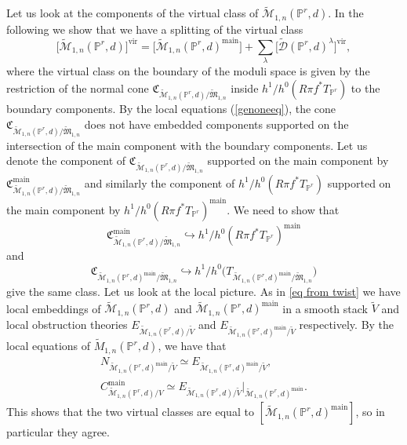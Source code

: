 \documentclass[pdftex]{sigma}
\numberwithin{equation}{section}
\newcommand{\vv}{\mathrm{vir}}
\newcommand{\PP}{\mathbb P}
\theoremstyle{plain}
\theoremstyle{definition}
\theoremstyle{remark}
\begin{document}
\begin{Example} Let us look at the components of the virtual class of $\widetilde{\mathcal{M}}_{1,n}(\PP^r,d)$. In the following we show that we have a splitting of the virtual class
\[\big[\widetilde{\mathcal{M}}_{1,n}(\PP^r,d)\big]^{\vv}=\big[\widetilde{\mathcal{M}}_{1,n} (\PP^r,d)^{\mathrm{main}}\big]+\sum_{\lambda}\big[\widetilde{\mathcal{D}}(\PP^r,d)^{\lambda}\big]^{\vv},
\]
where the virtual class on the boundary of the moduli space is given by the restriction of the normal cone $\mathfrak{C}_{\widetilde{\mathcal{M}}_{1,n}(\PP^r,d)/\widetilde{\mathfrak{M}}_{1,n}}$ inside $h^1/h^0(R\pi f^*T_{\PP^r})$ to the boundary components. By the local equations (\ref{genoneeq}), the cone $\mathfrak{C}_{\widetilde{\mathcal{M}}_{1,n}(\PP^r,d)/\widetilde{\mathfrak{M}}_{1,n}}$ does not have embedded components supported on the intersection of the main component with the boundary components. Let us denote the component of $\mathfrak{C}_{\widetilde{\mathcal{M}}_{1,n}(\PP^r,d)/\widetilde{\mathfrak{M}}_{1,n}}$ supported on the main component by $\mathfrak{C}^{\mathrm{main}}_{\widetilde{\mathcal{M}}_{1,n}(\PP^r,d)/\widetilde{\mathfrak{M}}_{1,n}}$ and similarly the component of $h^1/h^0(R\pi f^*T_{\PP^r})$ supported on the main component by $h^1/h^0(R\pi f^*T_{\PP^r})^{\mathrm{main}}$. We need to show that
\[\mathfrak{C}^{\mathrm{main}}_{\widetilde{\mathcal{M}}_{1,n}(\PP^r,d)/\widetilde{\mathfrak{M}}_{1,n}}\hookrightarrow h^1/h^0(R\pi f^*T_{\PP^r})^{\mathrm{main}}\]
 and
 \[\mathfrak{C}_{\widetilde{\mathcal{M}}_{1,n}(\PP^r,d)^{\mathrm{main}}/\widetilde{\mathfrak{M}}_{1,n}}\hookrightarrow h^1/h^0\big(T_{\widetilde{\mathcal{M}}_{1,n}(\PP^r,d)^{\mathrm{main}}/\widetilde{\mathfrak{M}}_{1,n}}\big)
 \]
 give the same class. Let us look at the local picture. As in \ref{eq from twist} we have local embeddings of $\widetilde{\mathcal{M}}_{1,n}(\PP^r,d)$ and $\widetilde{\mathcal{M}}_{1,n}(\PP^r,d)^{\mathrm{main}}$ in a smooth stack $\widetilde{V}$ and local obstruction theories $E_{\widetilde{\mathcal{M}}_{1,n}(\PP^r,d)/\widetilde{V}}$ and $E_{\widetilde{\mathcal{M}}_{1,n}(\PP^r,d)^{\mathrm{main}}/\widetilde{V}}$ respectively. By the local equations of $\widetilde{M}_{1,n}(\PP^r,d)$, we have that
\begin{gather*}
N_{\widetilde{\mathcal{M}}_{1,n}(\PP^r,d)^{\mathrm{main}}/\widetilde{V}}\simeq E_{\widetilde{\mathcal{M}}_{1,n}(\PP^r,d)^{\mathrm{main}}/\widetilde{V}},
\\
C_{\widetilde{\mathcal{M}}_{1,n}(\PP^r,d)/V}^{\mathrm{main}}\simeq E_{\widetilde{\mathcal{M}}_{1,n}(\PP^r,d)/\widetilde{V}}|_{\widetilde{\mathcal{M}}_{1,n} (\PP^r,d)^{\mathrm{main}}}.
\end{gather*}
This shows that the two virtual classes are equal to $[\widetilde{\mathcal{M}}_{1,n}(\PP^r,d)^{\mathrm{main}}]$, so in particular they agree.


\end{Example}
\end{document}
